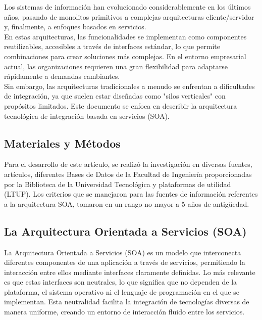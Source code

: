 \documentclass[10pt]{article}
\begin{document}
    Los sistemas de información han evolucionado considerablemente en los últimos años, pasando de monolitos primitivos a complejas arquitecturas cliente/servidor y, finalmente, a enfoques basados en servicios.\vspace{0.5 cm} \\ \hspace*{2.5em} En estas arquitecturas, las funcionalidades se implementan como componentes reutilizables, accesibles a través de interfaces estándar, lo que permite combinaciones para crear soluciones más complejas. En el entorno empresarial actual, las organizaciones requieren una gran flexibilidad para adaptarse rápidamente a demandas cambiantes.\vspace{0.5 cm} 
    \\ \hspace*{2.5em} Sin embargo, las arquitecturas tradicionales a menudo se enfrentan a dificultades de integración, ya que suelen estar diseñadas como "silos verticales" con propósitos limitados. Este documento se enfoca en describir la arquitectura tecnológica de integración basada en servicios (SOA).\vspace{1.5 cm} 
    
    \begin{center}
    \section{Materiales y Métodos}
    \end{center}
    \hspace*{2.5em} Para  el  desarrollo  de  este  artículo,  se  realizó  la investigación  en  diversas  fuentes,  artículos,  diferentes  Bases  de  Datos  de  la  Facultad  de  Ingeniería  proporcionadas  por  la  Biblioteca  de  la  Universidad  Tecnológica  y  plataformas  de  utilidad  (LTUP).  Los  criterios  que  se  manejaron  para  las  fuentes  de  información  referentes  a  la  arquitectura  SOA,  tomaron  en  un  rango  no  mayor  a  5  años  de  antigüedad.
    
    

     \subsection{La  Arquitectura  Orientada  a  Servicios  (SOA)}
     \hspace*{2.5em} La Arquitectura Orientada a Servicios (SOA) es un modelo que interconecta diferentes componentes de una aplicación a través de servicios, permitiendo la interacción entre ellos mediante interfaces claramente definidas. Lo más relevante es que estas interfaces son neutrales, lo que significa que no dependen de la plataforma, el sistema operativo ni el lenguaje de programación en el que se implementan. Esta neutralidad facilita la integración de tecnologías diversas de manera uniforme, creando un entorno de interacción fluido entre los servicios.
\end{document}

